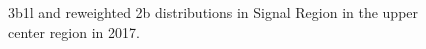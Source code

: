 \begin{figure}[ht]
 
 
    \caption{3b1l and reweighted 2b distributions in Signal Region in the upper center region in 2017.}
    \label{fig:upper-center-3b1l-SR-2017}
\end{figure}


